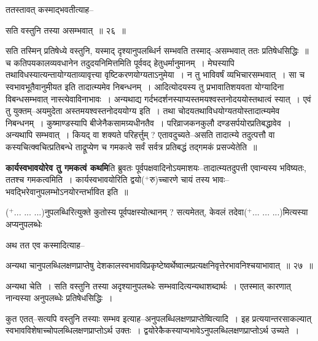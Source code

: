 \documentclass[article,12pt,a4paper]{memoir}
\newcommand{\add}[1]{($^{+}$#1)}
\begin{document}
	ततस्तावत् कस्माद्भवतीत्याह--  
	  
	सति वस्तुनि तस्या असम्भवात् ॥ २६ ॥ 
	  
	सति तस्मिन् प्रतिषेध्ये वस्तुनि, यस्माद् दृश्यानुपलब्धिर्न सम्भवति तस्माद्--असम्भवात् ततः प्रतिषेधसिद्धिः ॥ च कतिपयकालव्यवधानेन तदुदयनिमित्तमिति पूर्ववद् हेतुधर्मानुमानम् । मेघस्यापि तथाविधस्यात्यन्तायोग्यताव्यावृत्त्या वृष्टिकरणयोग्यताऽनुमेया । न तु भाविवर्षं व्यभिचारसम्भवात् । सा च स्वभावभूतैवानुमीयत इति तादात्म्यमेव निबन्धनम् । आदित्योदयस्य तु प्रभावातिशयवता योग्यादिना विबन्धसम्भवात् नास्त्येवाविनाभावः । अन्यथाद्य गर्दभदर्शनस्याप्यस्तमयश्वस्तनोदययोस्तथात्वं स्यात् । एवं तु युक्तम्--अयमुदेता अस्तमयश्वस्तनोदययोग्य इति । तथा चोदयतथाविधयोग्यतयोस्तादात्म्यमेव निबन्धनम् । कुष्माण्डस्यापि बीजेनैकसामग्र्यधीनतैव । परिव्राजकनकुलौ दण्डसर्पयोरप्रतिबद्धावेव । अन्यथापि सम्भवात् । कियद् वा शक्यते परिहर्त्तुम् ? एतावदुच्यते--असति तादात्म्ये तदुत्पत्तौ वा कस्यचित्क्वचित्प्रतिबन्धे ताद्रूप्येण च गमकत्वे सर्वं सर्वत्र प्रतिबद्धं तद्गमकं प्रसज्येतेति ॥
	\pend
      

	  \pstart \textbf{कार्यस्वभावयोरेव तु गमकत्वं कथमि}ति ब्रुवतः पूर्वपक्षवादिनोऽयमाशयः--तादात्म्यतदुपत्ती एवान्यस्य भविष्यतः, ततश्च गमकत्वमिति । कार्यस्वभावयोरिति द्वयो\add{रु}च्चारणे चायं तस्य भावः--भवद्भिरेवानुपलम्भोऽनयोरन्तर्भावित इति ॥
	\pend
      

	  \pstart {}\add{... ... ...}नुपलब्धिरित्युक्ते कुतोस्य पूर्वपक्षस्योत्थानम् ? सत्यमेतत्, केवलं तदेवा\add{... ... ...}मित्यस्या अप्यनुपल\leavevmode{}ब्धेः  \leavevmode{} 
	  
	अथ तत एव कस्मादित्याह--  
	  
	अन्यथा चानुपलब्धिलक्षणप्राप्तेषु देशकालस्वभावविप्रकृष्टेष्वर्थेष्वात्मप्रत्यक्षनिवृत्तेरभावनिश्चयाभावात् ॥ २७ ॥ 
	  
	अन्यथा चेति । सति वस्तुनि तस्या अदृश्यानुपलब्धेः सम्भवादित्यन्यथाशब्दार्थः । एतस्मात् कारणात् नान्यस्या अनुपलब्धेः प्रतिषेधसिद्धिः ।  
	  
	कुत एतत्--सत्यपि वस्तुनि तस्याः सम्भव इत्याह--अनुपलब्धिलक्षणप्राप्तेष्वित्यादि । इह प्रत्ययान्तरसाकल्यात् स्वभावविशेषाच्चोपलब्धिलक्षणप्राप्तोऽर्थ उक्तः । द्वयोरेकैकस्याप्यभावेऽनुपलब्धिलक्षणप्राप्तोऽर्थ उच्यते ।  
	  
\end{document}
